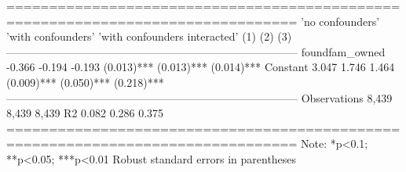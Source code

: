  ================================================================================                'no confounders' 'with confounders' 'with confounders interacted'                      (1)               (2)                      (3)              -------------------------------------------------------------------------------- foundfam_owned      -0.366            -0.194                  -0.193                               (0.013)***        (0.013)***              (0.014)***           Constant            3.047             1.746                    1.464                               (0.009)***        (0.050)***              (0.218)***           -------------------------------------------------------------------------------- Observations        8,439             8,439                    8,439             R2                  0.082             0.286                    0.375             ================================================================================ Note:                                                *p<0.1; **p<0.05; ***p<0.01                                            Robust standard errors in parentheses